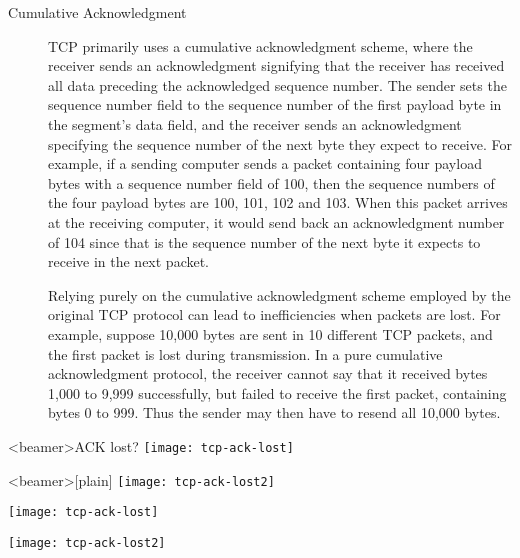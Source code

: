 \begin{description}
\item[Cumulative Acknowledgment]  TCP primarily uses a cumulative acknowledgment scheme, where
  the receiver sends an acknowledgment signifying that the receiver has received all data
  preceding the acknowledged sequence number. The sender sets the sequence number field to
  the sequence number of the first payload byte in the segment's data field, and the
  receiver sends an acknowledgment specifying the sequence number of the next byte they
  expect to receive. For example, if a sending computer sends a packet containing four
  payload bytes with a sequence number field of 100, then the sequence numbers of the four
  payload bytes are 100, 101, 102 and 103. When this packet arrives at the receiving
  computer, it would send back an acknowledgment number of 104 since that is the sequence
  number of the next byte it expects to receive in the next packet.

  Relying purely on the cumulative acknowledgment scheme employed by the original TCP
  protocol can lead to inefficiencies when packets are lost. For example, suppose 10,000
  bytes are sent in 10 different TCP packets, and the first packet is lost during
  transmission. In a pure cumulative acknowledgment protocol, the receiver cannot say that
  it received bytes 1,000 to 9,999 successfully, but failed to receive the first packet,
  containing bytes 0 to 999. Thus the sender may then have to resend all 10,000
  bytes. 
\end{description}

\begin{frame}<beamer>{ACK lost?}
  \centering
  \texttt{[image: tcp-ack-lost]}
\end{frame}

\begin{frame}<beamer>[plain]
  \centering
  \texttt{[image: tcp-ack-lost2]}
\end{frame}

\begin{minipage}{.42\linewidth}
  \texttt{[image: tcp-ack-lost]}  
\end{minipage}\hfill
\begin{minipage}{.56\linewidth}
  \texttt{[image: tcp-ack-lost2]}
\end{minipage}


